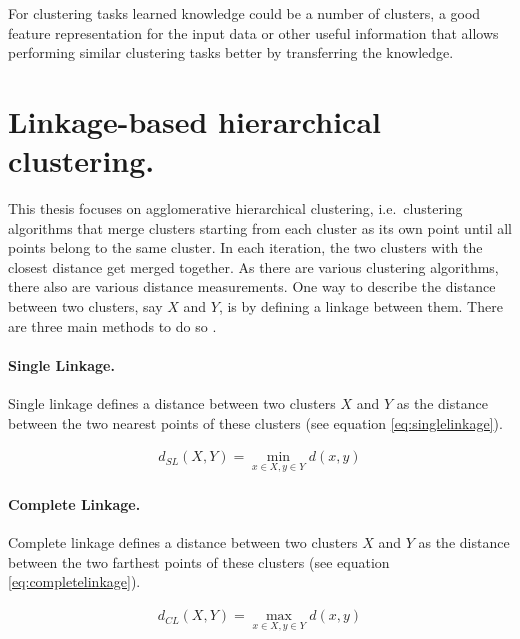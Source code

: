 For clustering tasks learned knowledge could be a number of clusters, a good feature representation for the input data or other useful information that allows performing similar clustering tasks better by transferring the knowledge.

\section{Linkage-based hierarchical clustering.}

This thesis focuses on agglomerative hierarchical clustering, i.e.\ clustering algorithms that merge clusters starting from each cluster as its own point until all points belong to the same cluster. In each iteration, the two clusters with the closest distance get merged together. As there are various clustering algorithms, there also are various distance measurements. One way to describe the distance between two clusters, say $X$ and $Y$, is by defining a linkage between them. There are three main methods to do so \cite{Manning:2008:IIR:1394399}.

\paragraph{Single Linkage.}

Single linkage defines a distance between two clusters $X$ and $Y$ as the distance between the two nearest points of these clusters (see equation \ref{eq:singlelinkage}).

\begin{equation}
    \begin{aligned}
        d_{SL}(X,Y) = \min\limits_{x \in X, y \in Y} d(x,y)
    \end{aligned}
    \label{eq:singlelinkage}
\end{equation}

\paragraph{Complete Linkage.}

Complete linkage defines a distance between two clusters $X$ and $Y$ as the distance between the two farthest points of these clusters (see equation \ref{eq:completelinkage}).

\begin{equation}
    \begin{aligned}
        d_{CL}(X,Y) = \max\limits_{x \in X, y \in Y} d(x,y)
    \end{aligned}
    \label{eq:completelinkage}
\end{equation}

